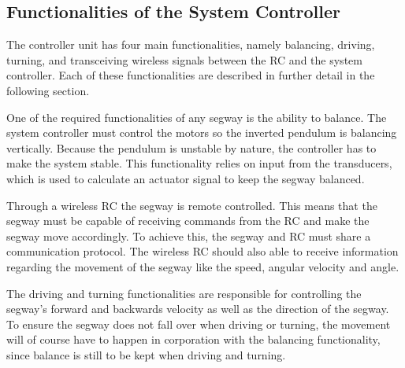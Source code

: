 \subsection{Functionalities of the System Controller}
The controller unit has four main functionalities, namely balancing, driving, turning, and transceiving wireless signals between the \gls{RC} and the system controller. Each of these functionalities are described in further detail in the following section.

One of the required functionalities of any segway is the ability to balance. The system controller must control the motors so the inverted pendulum is balancing vertically. Because the pendulum is unstable by nature, the controller has to make the system stable. This functionality relies on input from the transducers, which is used to calculate an actuator signal to keep the segway balanced.



Through a wireless RC the segway is remote controlled. This means that the segway must be capable of receiving commands from the RC and make the segway move accordingly. To achieve this, the segway and RC must share a communication protocol. The wireless RC should also able to receive information regarding the movement of the segway like the speed, angular velocity and angle.

The driving and turning functionalities are responsible for controlling the segway's forward and backwards velocity as well as the direction of the segway. To ensure the segway does not fall over when driving or turning, the movement will of course have to happen in corporation with the balancing functionality, since balance is still to be kept when driving and turning.

